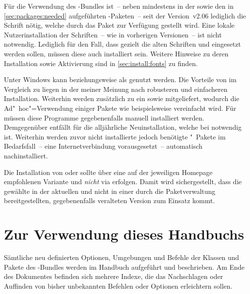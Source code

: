 Für die Verwendung des \TUDScript-Bundles ist~-- neben \KOMAScript mindestens 
in der  sowie den in \autoref{sec:packages:needed} 
aufgeführten -Paketen~-- seit der Version~v2.06 lediglich die 
Schrift \OpenSans nötig, welche durch das Paket  zur 
Verfügung gestellt wird. Eine lokale Nutzerinstallation der Schriften~-- wie in 
vorherigen Versionen~-- ist nicht notwendig. Lediglich für den Fall, dass 
gezielt die alten Schriften \Univers und \DIN eingesetzt werden sollen, müssen 
diese auch installiert sein. Weitere Hinweise zu deren Installation sowie 
Aktivierung sind in \autoref{sec:install:fonts} zu finden.



Unter Windows kann \TeXLive beziehungsweise \MiKTeX als \Distro genutzt werden. 
Die Vorteile von \TeXLive im Vergleich zu \MiKTeX liegen in der meiner Meinung 
nach robusteren und einfacheren Installation. Weiterhin werden zusätzlich zu 
 ein  sowie 
 mitgeliefert, wodurch die Ad"~hoc"=Verwendung 
einiger Pakete wie beispielsweise  vereinfacht wird. Für 
\MiKTeX müssen diese Programme gegebenenfalls manuell installiert werden. 
Demgegenüber entfällt für \MiKTeX die alljährliche Neuinstallation, welche bei 
\TeXLive notwendig ist. Weiterhin werden zuvor nicht installierte jedoch 
benötigte "~Pakete im Bedarfsfall~-- eine Internetverbindung 
vorausgesetzt~-- automatisch nachinstalliert.



Die Installation von \href{https://tug.org/texlive/}{\TeXLive} oder 
\href{https://tug.org/mactex/}{\MacTeX} sollte über eine auf der jeweiligen 
Homepage empfohlenen Variante und \emph{nicht} via  
erfolgen. Damit wird sichergestellt, dass die gewählte \Distro in der aktuellen 
und nicht in einer durch die Paketverwaltung bereitgestellten, gegebenenfalls 
veralteten Version zum Einsatz kommt.



\section{Zur Verwendung dieses Handbuchs}

Sämtliche neu definierten Optionen, Umgebungen und Befehle der Klassen und 
Pakete des \TUDScript-Bundles werden im Handbuch aufgeführt und beschrieben. Am 
Ende des Dokumentes befinden sich mehrere Indexe, die das Nachschlagen oder 
Auffinden von bisher unbekannten Befehlen oder Optionen erleichtern sollen.

